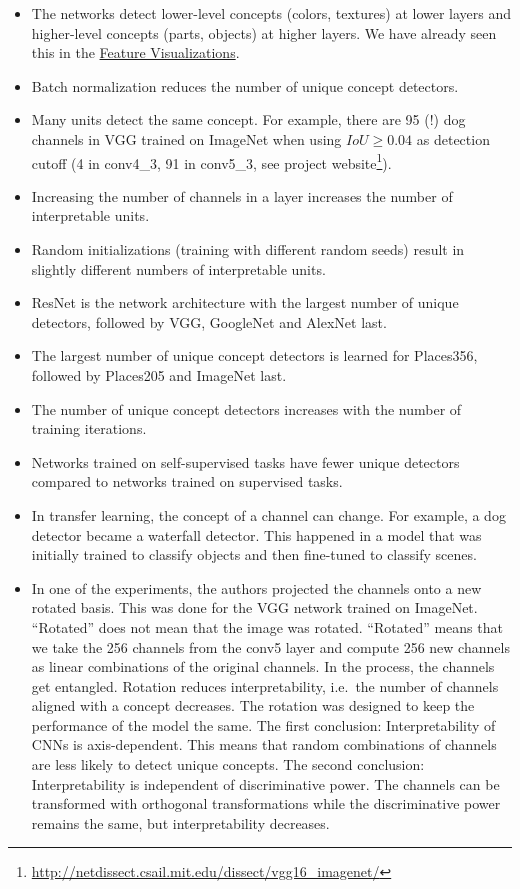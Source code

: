 \documentclass[
  11pt,
]{scrbook}
\providecommand{\tightlist}{%
  \setlength{\itemsep}{0pt}\setlength{\parskip}{0pt}}
\renewcommand{\href}[2]{#2\footnote{\url{#1}}}
\begin{document}
\begin{itemize}
\tightlist
\item
  The networks detect lower-level concepts (colors, textures) at lower layers and higher-level concepts (parts, objects) at higher layers.
  We have already seen this in the \protect\hyperlink{feature-visualization}{Feature Visualizations}.
\item
  Batch normalization reduces the number of unique concept detectors.
\item
  Many units detect the same concept.
  For example, there are 95 (!) dog channels in VGG trained on ImageNet when using \(IoU \geq 0.04\) as detection cutoff (4 in conv4\_3, 91 in conv5\_3, see \href{http://netdissect.csail.mit.edu/dissect/vgg16_imagenet/}{project website}).
\item
  Increasing the number of channels in a layer increases the number of interpretable units.
\item
  Random initializations (training with different random seeds) result in slightly different numbers of interpretable units.
\item
  ResNet is the network architecture with the largest number of unique detectors, followed by VGG, GoogleNet and AlexNet last.
\item
  The largest number of unique concept detectors is learned for Places356, followed by Places205 and ImageNet last.
\item
  The number of unique concept detectors increases with the number of training iterations.
\item
  Networks trained on self-supervised tasks have fewer unique detectors compared to networks trained on supervised tasks.
\item
  In transfer learning, the concept of a channel can change. For example, a dog detector became a waterfall detector. This happened in a model that was initially trained to classify objects and then fine-tuned to classify scenes.
\item
  In one of the experiments, the authors projected the channels onto a new rotated basis.
  This was done for the VGG network trained on ImageNet.
  ``Rotated'' does not mean that the image was rotated.
  ``Rotated'' means that we take the 256 channels from the conv5 layer and compute 256 new channels as linear combinations of the original channels.
  In the process, the channels get entangled.
  Rotation reduces interpretability, i.e.~the number of channels aligned with a concept decreases.
  The rotation was designed to keep the performance of the model the same.
  The first conclusion:
  Interpretability of CNNs is axis-dependent.
  This means that random combinations of channels are less likely to detect unique concepts.
  The second conclusion:
  Interpretability is independent of discriminative power.
  The channels can be transformed with orthogonal transformations while the discriminative power remains the same, but interpretability decreases.
\end{itemize}
\end{document}
